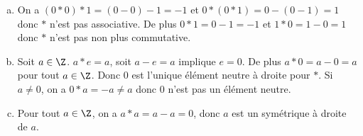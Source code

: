 \begin{enumerate}[a)]
\item On a $(0*0)*1 = (0-0)-1 = -1$ et $0*(0*1) = 0-(0-1) = 1$ donc $*$ n'est
pas associative.  De plus $0*1 = 0-1 = -1$ et $1*0 = 1-0 = 1$ donc $*$ n'est
pas non plus commutative.

\item Soit $a\in\Z$. $a*e = a$, soit $a-e = a$ implique $e = 0$.  De plus $a*0
= a-0 = a$ pour tout $a\in\Z$.  Donc $0$ est l'unique élément neutre à droite
pour $*$.  Si $a \neq 0$, on a $0*a = -a \neq a$ donc $0$ n'est pas un élément
neutre.

\item Pour tout $ a\in\Z$, on a $a*a = a-a = 0$, donc $a$ est un symétrique à
droite de $a$.
\end{enumerate}


